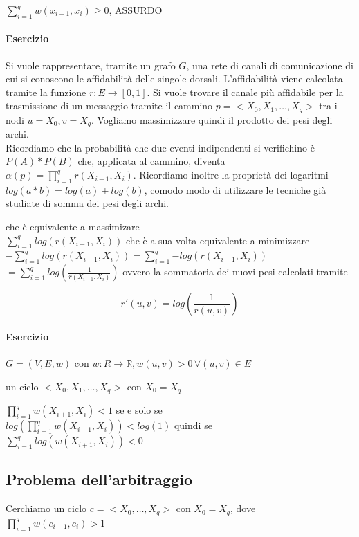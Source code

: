 \documentclass[11pt,a4paper,twoside,openright]{book}
\let\oldparagraph\paragraph
\renewcommand{\paragraph}[1]{\oldparagraph{#1}\mbox{}}
\begin{document}
{{$\sum_{i=1}^q{w(x_{i-1},x_i)} \geq 0$, ASSURDO


\paragraph{Esercizio}

Si vuole rappresentare, tramite un grafo $G$, una rete di canali di comunicazione di cui si conoscono le affidabilità delle singole dorsali. L'affidabilità viene calcolata tramite la funzione $r : E \rightarrow [0,1]$. Si vuole trovare il canale più affidabile per la trasmissione di un messaggio tramite il cammino $p = <X_0,X_1,\ldots,X_q>$ tra i nodi $u =X_0,v=X_q$. Vogliamo massimizzare quindi il prodotto dei pesi degli archi. \\
Ricordiamo che la probabilità che due eventi indipendenti si verifichino è $P(A) * P(B)$ che, applicata al cammino, diventa $\alpha(p) = \prod_{i=1}^{q}{r(X_{i-1},X_i)}$. Ricordiamo inoltre la proprietà dei logaritmi $log(a*b) = log(a) + log(b)$, comodo modo di utilizzare le tecniche già studiate di somma dei pesi degli archi.


che è equivalente a massimizare \\ 		 
$\sum_{i=1}^q{log(r(X_{i-1},X_i))}$
che è a sua volta equivalente a minimizzare \\
$-\sum_{i=1}^q{log(r(X_{i-1},X_i))} = \sum_{i=1}^q{-log(r(X_{i-1},X_i))}$ \\
$ = \sum_{i=1}^q{log(\frac{1}{r(X_{i-1},X_i)})}$ ovvero la sommatoria dei nuovi pesi calcolati tramite 

\begin{equation}
r'(u,v) = log(\frac{1}{r(u,v)})
\end{equation}

\paragraph{Esercizio}

$G=(V,E,w)$ con $w: R \rightarrow \mathbb{R}, w(u,v) >0\,\forall (u,v) \in E$

un ciclo $<X_0,X_1,\ldots,X_q>$ con $X_0 = X_q$

$\prod_{i=1}^q{w(X_{i+1},X_i)} < 1$ se e solo se \\
$log(\prod_{i=1}^q{w(X_{i+1},X_i)}) < log(1)$ quindi se \\
$\sum_{i=1}^q{log(w(X_{i+1},X_i))} < 0$



\subsection{Problema dell'arbitraggio}
Cerchiamo un ciclo $c = <X_0,\ldots,X_q>$ con $X_0 = X_q$, dove $\prod_{i=1}^q{w(c_{i-1},c_i)} > 1$

}}
\end{document}
